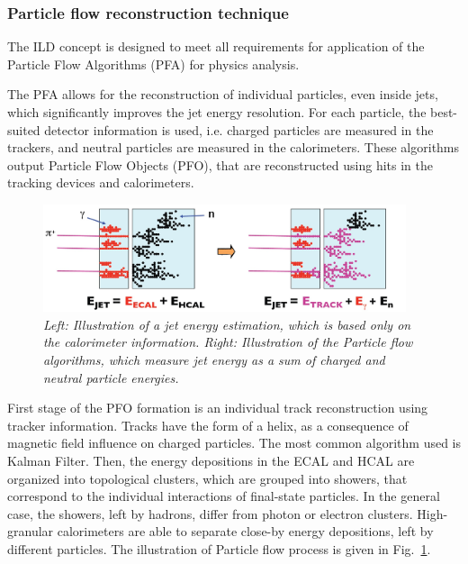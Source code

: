 

\subsubsection{Particle flow reconstruction technique}
The ILD concept is designed to meet all requirements for application of the Particle Flow Algorithms (PFA) for physics analysis. 

The PFA allows for the reconstruction of individual particles, even inside jets, which significantly improves the jet energy resolution. For each particle, the best-suited detector information is used, i.e. charged particles are measured in the trackers, and neutral particles are measured in the calorimeters.%
These algorithms output Particle Flow Objects (PFO), that are reconstructed using hits in the tracking devices and calorimeters. 

\begin{figure}
{\centering
    \includegraphics[width=0.95\textwidth]{graphics/calirometry_traditional_new.jpg}
    \caption{\sl Left: Illustration of a jet energy estimation, which is based only on the calorimeter information. Right: Illustration of the Particle flow algorithms, which measure jet energy as a sum of charged and neutral particle energies.}
    \label{fig:PFAillustration}
  }
\end{figure}

First stage of the PFO formation is an individual track reconstruction using tracker information. Tracks have the form of a helix, as a consequence of magnetic field influence on charged particles.  The most common algorithm used is Kalman Filter.
Then, the energy depositions in the ECAL and HCAL are organized into topological clusters, which are grouped into showers, that correspond to the individual interactions of final-state particles. 
In the general case, the showers, left by hadrons, differ from photon or electron clusters. %
High-granular calorimeters are able to separate close-by energy depositions, left by different particles. The illustration of Particle flow process is given in Fig.~\ref{fig:PFAillustration}.

